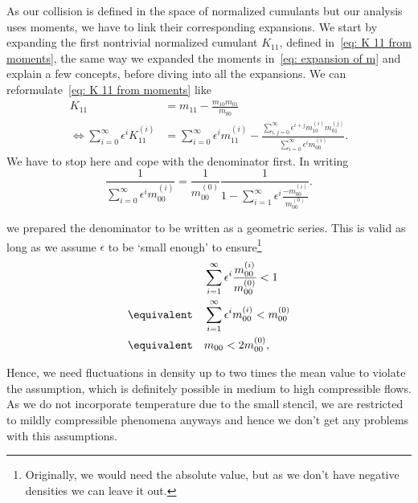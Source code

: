 As our collision is defined in the space of normalized cumulants but our analysis uses moments, we have to link their corresponding expansions.
We start by expanding the first nontrivial normalized cumulant $K_{11}$, defined in~\eqref{eq: K 11 from moments}, the same way we expanded the moments in~\eqref{eq: expansion of m} and explain a few concepts, before diving into all the expansions.
We can reformulate~\eqref{eq: K 11 from moments} like
\begin{equation}
  \label{eq: first expansion}
  \begin{aligned}
    K_{11} & = m_{11} - \frac{m_{10}m_{01}}{m_{00}}\\
    \Leftrightarrow
    \sum_{i=0}^\infty \epsilon^i K_{11}^{(i)}
    & = \sum_{i=0}^\infty \epsilon^i m_{11}^{(i)} -
    \frac{\sum_{i,j=0}^\infty \epsilon^{i+j} m_{10}^{(i)}m_{01}^{(j)}}
        {\sum_{i=0}^\infty \epsilon^i m_{00}^{(i)}}.
  \end{aligned}
\end{equation}
We have to stop here and cope with the denominator first.
In writing
\begin{equation*}
  \frac{1}{\sum_{i=0}^\infty \epsilon^i m_{00}^{(i)}}=
  \frac{1}{m_{00}^{(0)}}
  \frac{1}{1 - \sum_{i=1}^\infty \epsilon^i \frac{ - m_{00}^{(i)}}{ m_{00}^{(0)}}}.
\end{equation*}

we prepared the denominator to be written as a geometric series.
This is valid as long as we assume $\epsilon$ to be `small enough' to ensure\footnote{Originally, we would need the absolute value, but as we don't have negative densities we can leave it out.}
\begin{align*}
  &\sum_{i=1}^\infty \epsilon^i \frac{ m_{00}^{(i)}}{ m_{00}^{(0)}}  < 1
  \\
  \equivalent\quad& \sum_{i=1}^\infty \epsilon^i  m_{00}^{(i)} < m_{00}^{(0)}
  \\
  \equivalent\quad& m_{00} < 2 m_{00}^{(0)},
\end{align*}

Hence, we need fluctuations in density up to two times the mean value to violate the assumption, which is definitely possible in medium to high compressible flows.
As we do not incorporate temperature due to the small stencil, we are restricted to mildly compressible phenomena anyways and hence we don't get any problems with this assumptions.

